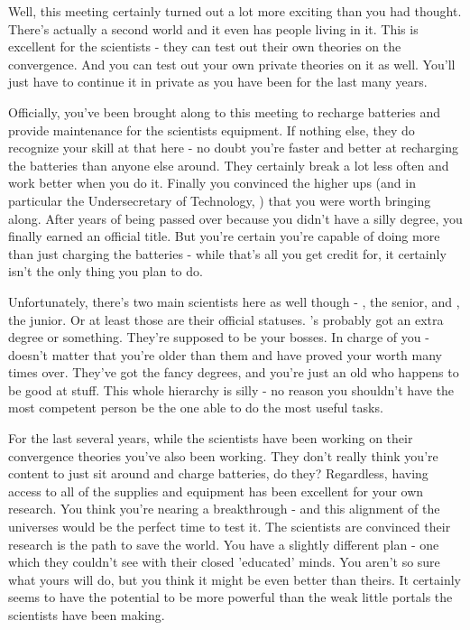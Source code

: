 \documentclass[char]{guildcamp3}
\begin{document}
\name{\cTech{}}

Well, this meeting certainly turned out a lot more exciting than you had thought. There's actually a second world and it even has people living in it. This is excellent for the scientists - they can test out their own theories on the convergence. And you can test out your own private theories on it as well. You'll just have to continue it in private as you have been for the last many years. 

Officially, you've been brought along to this meeting to recharge batteries and provide maintenance for the scientists equipment. If nothing else, they do recognize your skill at that here - no doubt you're faster and better at recharging the batteries than anyone else around. They certainly break a lot less often and work better when you do it. Finally you convinced the higher ups (and in particular the Undersecretary of Technology, \cPoliTwo{\intro}) that you were worth bringing along. After years of being passed over because you didn't have a silly degree, you finally earned an official title. But you're certain you're capable of doing more than just charging the batteries - while that's all you get credit for, it certainly isn't the only thing you plan to do. 

Unfortunately, there's two main scientists here as well though - \cSciOne{\intro}, the senior, and \cSciTwo{\intro}, the junior. Or at least those are their official statuses. \cSciOne{}'s probably got an extra degree or something. They're supposed to be your bosses. In charge of you - doesn't matter that you're older than them and have proved your worth many times over. They've got the fancy degrees, and you're just an old \cTech{\human} who happens to be good at stuff. This whole hierarchy is silly - no reason you shouldn't have the most competent person be the one able to do the most useful tasks. 

For the last several years, while the scientists have been working on their convergence theories you've also been working. They don't really think you're content to just sit around and charge batteries, do they? Regardless, having access to all of the supplies and equipment has been excellent for your own research. You think you're nearing a breakthrough - and this alignment of the universes would be the perfect time to test it. The scientists are convinced their research is the path to save the world. You have a slightly different plan - one which they couldn't see with their closed 'educated' minds. You aren't so sure what yours will do, but you think it might be even better than theirs. It certainly seems to have the potential to be more powerful than the weak little portals the scientists have been making. 
\end{document}
